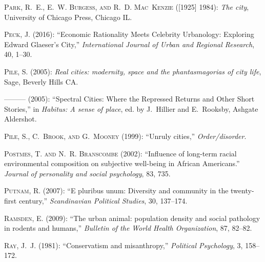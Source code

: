 \documentclass[11pt, letterpaper]{article}
\begin{document}
\begin{spacing}{1.4}
\begin{thebibliography}{92}
\textsc{Park, R.~E., E.~W. Burgess, and R.~D. Mac~Kenzie} ([1925] 1984):
  \emph{The city}, University of Chicago Press, Chicago IL.

\textsc{Peck, J.} (2016): \enquote{Economic Rationality Meets Celebrity
  Urbanology: Exploring Edward Glaeser's City,} \emph{International Journal of
  Urban and Regional Research}, 40, 1--30.

\textsc{Pile, S.} (2005{}): \emph{Real cities: modernity, space and
  the phantasmagorias of city life}, Sage, Beverly Hills CA.

---\hspace{-.1pt}---\hspace{-.1pt}--- (2005{}): \enquote{Spectral
  Cities: Where the Repressed Returns and Other Short Stories,} in
  \emph{Habitus: A sense of place}, ed. by J.~Hillier and E.~Rooksby, Ashgate
  Aldershot.

\textsc{Pile, S., C.~Brook, and G.~Mooney} (1999): \enquote{Unruly cities,}
  \emph{Order/disorder}.

\textsc{Postmes, T. and N.~R. Branscombe} (2002): \enquote{Influence of
  long-term racial environmental composition on subjective well-being in
  African Americans.} \emph{Journal of personality and social psychology}, 83,
  735.

\textsc{Putnam, R.} (2007): \enquote{E pluribus unum: Diversity and community
  in the twenty-first century,} \emph{Scandinavian Political Studies}, 30,
  137--174.

\textsc{Ramsden, E.} (2009): \enquote{The urban animal: population density and
  social pathology in rodents and humans,} \emph{Bulletin of the World Health
  Organization}, 87, 82--82.

\textsc{Ray, J.~J.} (1981): \enquote{Conservatism and misanthropy,}
  \emph{Political Psychology}, 3, 158--172.


\end{thebibliography}
\end{spacing}
\end{document}
